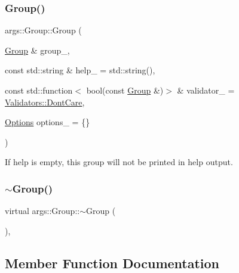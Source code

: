 \subsubsection{\texorpdfstring{Group()}{Group()}\hspace{0.1cm}{\footnotesize\ttfamily [2/2]}}
{\footnotesize\ttfamily args\+::\+Group\+::\+Group (\begin{DoxyParamCaption}\item[{\hyperlink{classargs_1_1_group}{Group} \&}]{group\+\_\+,  }\item[{const std\+::string \&}]{help\+\_\+ = {\ttfamily std\+:\+:string()},  }\item[{const std\+::function$<$ bool(const \hyperlink{classargs_1_1_group}{Group} \&)$>$ \&}]{validator\+\_\+ = {\ttfamily \hyperlink{structargs_1_1_group_1_1_validators_adf7a904f8fa0d4ea9f1c47ea057a5417}{Validators\+::\+Dont\+Care}},  }\item[{\hyperlink{namespaceargs_aa530c0f95194aa275f49a5f299ac9e77}{Options}}]{options\+\_\+ = {\ttfamily \{\}} }\end{DoxyParamCaption})\hspace{0.3cm}{\ttfamily [inline]}}



If help is empty, this group will not be printed in help output. 

\mbox{\label{classargs_1_1_group_a928331572568f1d3878f870323da8024}} 
\subsubsection{\texorpdfstring{$\sim$\+Group()}{~Group()}}
{\footnotesize\ttfamily virtual args\+::\+Group\+::$\sim$\+Group (\begin{DoxyParamCaption}{ }\end{DoxyParamCaption})\hspace{0.3cm}{\ttfamily [inline]}, {\ttfamily [virtual]}}



\subsection{Member Function Documentation}
\mbox{\label{classargs_1_1_group_ae5951da80c2ca072299740021c43bf6b}} 
